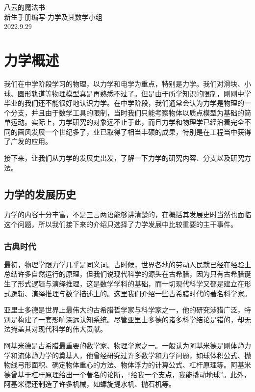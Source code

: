 \begin{flushright}
	八云的魔法书\\
	新生手册编写-力学及其数学小组\\
	2022.9.29
\end{flushright}
\newpage

\section{力学概述}

我们在中学阶段学习的物理，以力学和电学为重点，特别是力学。我们对滑块、小球、圆形轨道等物理模型真是再熟悉不过了。但是由于所学知识的限制，刚刚中学毕业的我们还不能很好地认识力学。在中学阶段，我们通常会认为力学是物理的一个分支，并且由于数学工具的限制，当时我们只能考察物体以质点模型为基础的简单运动。实际上，力学研究的对象远不止于此，而且力学和物理学已经沿着完全不同的画风发展一个世纪多了，业已取得了相当丰硕的成果，特别是在工程当中获得了广发的应用。

接下来，让我们从力学的发展史出发，了解一下力学的研究内容、分支以及研究方法。

\subsection{力学的发展历史}

力学的内容十分丰富，不是三言两语能够讲清楚的，在概括其发展史时当然也面临这个问题，所以我们接下来的介绍只选择了力学发展中比较重要的主干事件。

\subsubsection{古典时代}

最初，物理学跟力学几乎是同义词。古时候，世界各地的劳动人民就已经在经验上总结许多自然运行的原理，但我们说现代科学的源头在古希腊，因为只有古希腊诞生了形式逻辑与演绎推理，这是数学学科的基础，而一切现代科学又都是建立在形式逻辑、演绎推理与数学描述上的。这里我们介绍一些古希腊时代的著名科学家。

亚里士多德是世界上最伟大的古希腊哲学家与科学家之一，他的研究涉猎广泛，特别是构建了一套影响深远认知系统。尽管亚里士多德的诸多科学结论是错的，却无法掩盖其对现代科学的伟大贡献。

阿基米德是古希腊最重要的数学家、物理学家之一。一般认为阿基米德是刚体静力学和流体静力学的奠基人，他曾经研究过许多数学和力学问题，如球体积公式、抛物线弓形面积、确定物体重心的方法、物体浮力的计算公式、杠杆原理等。阿基米德曾基于杠杆原理给出一个著名的论断，“给我一个支点，我能撬动地球”。此外，阿基米德还制造了许多机械，如螺旋提水机、抛石机等。

